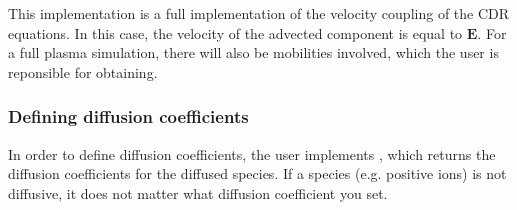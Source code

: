 \documentclass[letterpaper,10pt,english]{sphinxmanual}
\begin{document}
\begin{sphinxVerbatim}[commandchars=\\\{\},formatcom=\scriptsize]
           
                                              
                                              
                                            
    
   \PYG{p}{[}\PYG{p}{]}  
    
\end{sphinxVerbatim}

This implementation is a full implementation of the velocity coupling of the CDR equations. In this case, the velocity of the advected component is equal to \(\mathbf{E}\). For a full plasma simulation, there will also be mobilities involved, which the user is reponsible for obtaining.


\subsubsection{Defining diffusion coefficients}
\label{\detokenize{MinimalPlasmaModel:defining-diffusion-coefficients}}
In order to define diffusion coefficients, the user implements , which returns the diffusion coefficients for the diffused species. If a species (e.g. positive ions) is not diffusive, it does not matter what diffusion coefficient you set.
\end{document}
